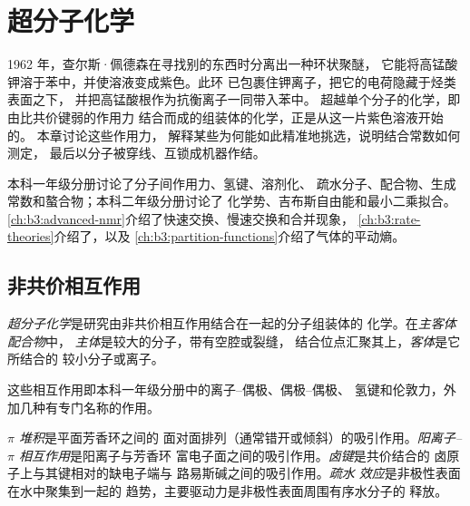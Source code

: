 \chapter{超分子化学}\label{ch:b3:supramolecular}

1962 年，查尔斯·佩德森在寻找别的东西时分离出一种环状聚醚，
它能将高锰酸钾溶于苯中，并使溶液变成紫色。此环
已包裹住钾离子，把它的电荷隐藏于烃类表面之下，
并把高锰酸根作为抗衡离子一同带入苯中。
超越单个分子的化学，即由比共价键弱的作用力
结合而成的组装体的化学，正是从这一片紫色溶液开始的。
本章讨论这些作用力，
解释某些为何能如此精准地挑选，说明结合常数如何测定，
最后以分子被穿线、互锁成机器作结。

\begin{recall}
本科一年级分册讨论了分子间作用力、氢键、溶剂化、
疏水分子、配合物、生成常数和螯合物；本科二年级分册讨论了
化学势、吉布斯自由能和最小二乘拟合。
\cref{ch:b3:advanced-nmr}介绍了快速交换、慢速交换和合并现象，
\cref{ch:b3:rate-theories}介绍了，以及
\cref{ch:b3:partition-functions}介绍了气体的平动熵。
\end{recall}

\section{非共价相互作用}

\begin{definition}[超分子化学]\label{def:b3:supramolecular:supramolecular}
\emph{超分子化学}是研究由非共价相互作用结合在一起的分子组装体的
化学。在\emph{主客体配合物}中，
\emph{主体}是较大的分子，带有空腔或裂缝，
结合位点汇聚其上，\emph{客体}是它所结合的
较小分子或离子。
\end{definition}

这些相互作用即本科一年级分册中的离子–偶极、偶极–偶极、
氢键和伦敦力，外加几种有专门名称的作用。

\begin{definition}[非共价相互作用]\label{def:b3:supramolecular:interactions}
\emph{$\pi$ 堆积}是平面芳香环之间的
面对面排列（通常错开或倾斜）的吸引作用。\emph{阳离子–$\pi$
相互作用}是阳离子与芳香环
富电子面之间的吸引作用。\emph{卤键}是共价结合的
卤原子上与其键相对的缺电子端与
路易斯碱之间的吸引作用。\emph{疏水
效应}是非极性表面在水中聚集到一起的
趋势，主要驱动力是非极性表面周围有序水分子的
释放。
\end{definition}

